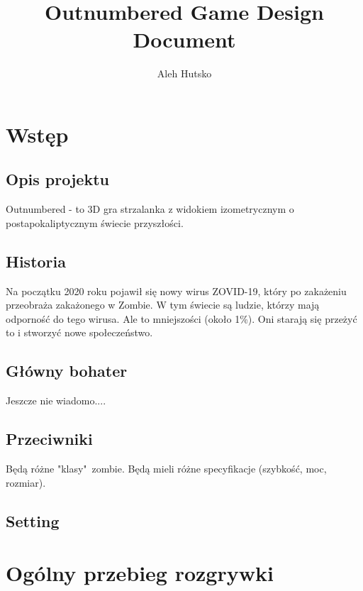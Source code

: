 \documentclass[letterpaper,12pt]{report}
\author{Aleh Hutsko}
\title{Outnumbered Game Design Document}
\date{}
\begin{document}
    \maketitle
    \clearpage
    \tableofcontents
    \clearpage
    \chapter{Wstęp}
    \section{Opis projektu}

    Outnumbered - to 3D gra strzalanka z widokiem
    izometrycznym o postapokaliptycznym świecie przyszłości.

    \section{Historia}

    Na początku 2020 roku pojawił się nowy wirus ZOVID-19,
    który po zakażeniu przeobraża zakażonego w Zombie. W tym
    świecie są ludzie, którzy mają odporność do tego wirusa.
    Ale to mniejszości (około 1\%). Oni starają się przeżyć to
    i stworzyć nowe społeczeństwo.

    \section{Główny bohater}

    \color{red}
    Jeszcze nie wiadomo....

    \color{black}

    \section{Przeciwniki}

    Będą różne "klasy"\ zombie. Będą mieli różne specyfikacje 
    (szybkość, moc, rozmiar).

    \section{Setting}

    \chapter{Ogólny przebieg rozgrywki}
\end{document}
